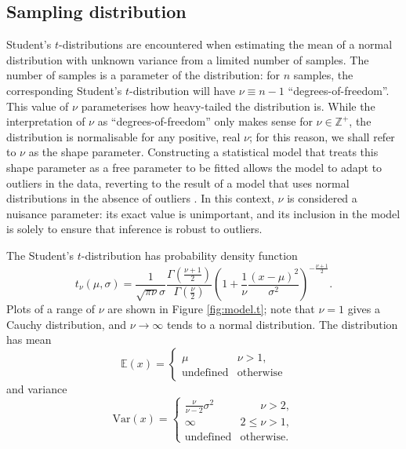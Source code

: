 \documentclass[fleqn,usenatbib]{mnras}
\newcommand{\studentt}[2]{t_\nu \left( #1, #2 \right)}
\begin{document}
\subsection{Sampling distribution}
\label{sec:formalism.sampling}

Student's $t$-distributions are encountered when estimating the mean of a normal
distribution with unknown variance from a limited number of samples. The number
of samples is a parameter of the distribution: for $n$ samples, the
corresponding Student's $t$-distribution will have $\nu \equiv n - 1$
``degrees-of-freedom''. This value of $\nu$ parameterises how heavy-tailed the
distribution is. While the interpretation of $\nu$ as ``degrees-of-freedom''
only makes sense for $\nu \in \mathbb Z^+$, the distribution is normalisable for
any positive, real $\nu$; for this reason, we shall refer to $\nu$ as the shape
parameter. Constructing a statistical model that treats this shape parameter as
a free parameter to be fitted allows the model to adapt to outliers in the data,
reverting to the result of a model that uses normal distributions in the absence
of outliers \citep{Feeney:2018}. In this context, $\nu$ is considered a
nuisance parameter: its exact value is unimportant, and its inclusion in the
model is solely to ensure that inference is robust to outliers.

The Student's $t$-distribution has probability density function
\begin{equation}
    \studentt{\mu}{\sigma}
        =
    \frac{1}{\sqrt{\pi \nu} \sigma}
    \frac{
        \Gamma \left(\frac{\nu + 1}2\right)
    }{
        \Gamma \left(\frac{\nu}2\right)
    }
    \left(
        1 + \frac{1}{\nu} \frac{\left(x - \mu\right)^2}{\sigma^2}
    \right)^{
        -\frac{\nu + 1}{2}
    }.
\end{equation}
Plots of a range of $\nu$ are shown in Figure \ref{fig:model.t}; note that $\nu
= 1$ gives a Cauchy distribution, and $\nu \rightarrow \infty$ tends to a normal
distribution. The distribution has mean
\begin{equation}
    \mathbb{E}(x)
        =
    \begin{cases}
        \mu & \nu > 1, \\
        \textrm{undefined} & \textrm{otherwise}
    \end{cases}
\end{equation}
and variance
\begin{equation}
    \mathrm{Var}(x)
        =
    \begin{cases}
        \frac{\nu}{\nu - 2} \sigma^2 & \phantom{2 \leq} \nu > 2, \\
        \infty & 2 \leq \nu > 1, \\
        \textrm{undefined} & \textrm{otherwise.}
    \end{cases}
\end{equation}
\end{document}
